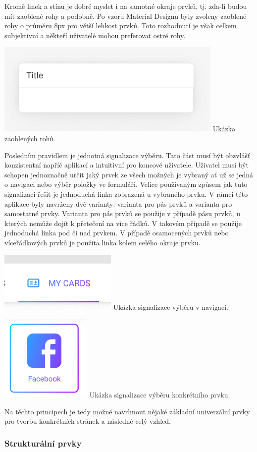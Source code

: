 \begin{itemize}
\begin{itemize}
		Kromě linek a stínu je dobré myslet i na samotné okraje prvků, tj. zda-li budou mít zaoblené rohy a podobně.
		Po vzoru Material Designu byly zvoleny zaoblené rohy o průměru 8px pro větší lehkost prvků.
		Toto rozhodnutí je však celkem subjektivní a někteří uživatelé mohou preferovat ostré rohy.

		\includegraphics[width=0.24\linewidth]{obrazky/blok_obsahu}\hfill
		Ukázka zaoblených rohů. %

		Posledním pravidlem je jednotná signalizace výběru.
		Tato část musí být obzvlášť konzistentní napříč aplikací a intuitivní pro koncové uživatele.
		Uživatel musí být schopen jednoznačně určit jaký prvek ze všech možných je vybraný ať už se jedná o navigaci
		nebo výběr položky ve formuláři.
		Velice používaným způsem jak tuto signalizaci řešit je jednoduchá linka zobrazená u vybraného prvku.
		V rámci této aplikace byly navrženy dvě varianty: varianta pro pás prvků a varianta pro samostatné prvky.
		Varianta pro pás prvků se použije v případě pásu prvků, u kterých nemůže dojít k přetečení na více řádků.
		V takovém případě se použije jednoduchá linka pod či nad prvkem.
		V případě osamocených prvků nebo víceřádkových prvků je použita linka kolem celého okraje prvku.

		\includegraphics[width=0.24\linewidth]{obrazky/ukazka_vyberu_1}\hfill
		Ukázka signalizace výběru v navigaci. %

		\includegraphics[width=0.24\linewidth]{obrazky/ukazka_vyberu_2}\hfill
		Ukázka signalizace výběru konkrétního prvku. %

		Na těchto principech je tedy možné navrhnout nějaké základní univerzální prvky pro tvorbu konkrétních stránek
		a následně celý vzhled.

		\subsubsection{Strukturální prvky}


\end{itemize}
\end{itemize}
